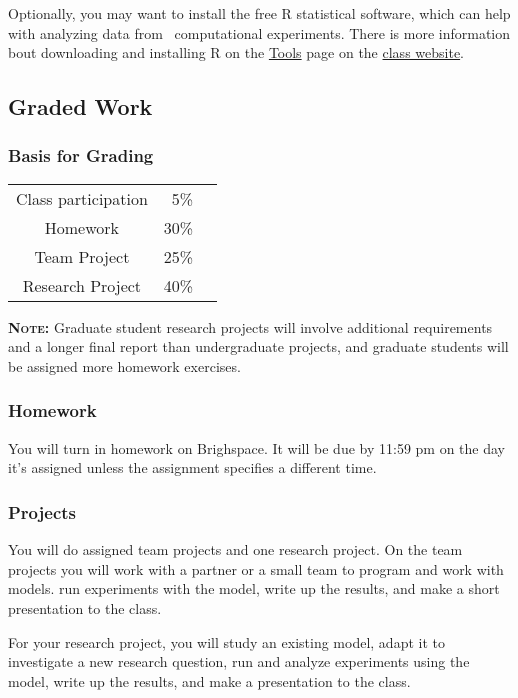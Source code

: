 \documentclass[11pt,twoside]{jgsyllabus}\usepackage[]{graphicx}\usepackage[]{xcolor}
\begin{document}
Optionally, you may want to install the free R statistical software, which can
help with analyzing data from \NetLogo\ computational experiments. There is more
information bout downloading and installing R on the
\href{https://ees4760.jgilligan.org/tools}{Tools} page on the
\href{https://ees4760.jgilligan.org}{class website}.

\subsection{Graded Work}
%
%
%
\subsubsection[Grading]{Basis for Grading}
\begin{center}
	\begin{tabular}[t]{crr}
		Class participation & 5\% &\\
		Homework & 30\% &\\
		Team Project & 25\% &\\
		Research Project & 40\% &
	\end{tabular}
\end{center}

\textbf{\scshape Note:} Graduate student research projects will involve
additional requirements and a longer final report than undergraduate projects,
and graduate students will be assigned more homework exercises.

\subsubsection{Homework}
You will turn in homework on Brighspace. It will be due by 11:59 pm on the day
it's assigned unless the assignment specifies a different time.
%
\subsubsection{Projects}
You will do assigned team projects and one research project.
On the team projects you will work with a partner or a small team to program
and work with models.
run experiments with the model, write up the results, and make a short
presentation to the class.

For your research project, you will study an existing model, adapt it to
investigate a new research question, run and analyze experiments using the
model, write up the results, and make a presentation to the class.
\end{document}
